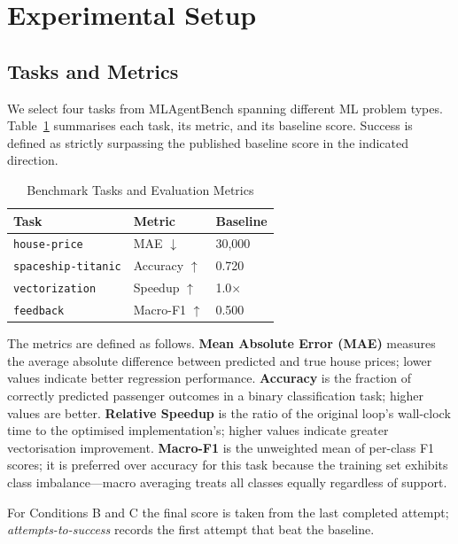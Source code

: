 \documentclass[conference]{IEEEtran}
\begin{document}
\section{Experimental Setup}

\subsection{Tasks and Metrics}

We select four tasks from MLAgentBench spanning different ML problem types.
Table~\ref{tab:tasks} summarises each task, its metric, and its baseline score.
Success is defined as strictly surpassing the published baseline score in the
indicated direction.

\begin{table}[h]
\caption{Benchmark Tasks and Evaluation Metrics}
\label{tab:tasks}
\centering
\begin{tabular}{lll}
\toprule
Task & Metric & Baseline \\
\midrule
\texttt{house-price} & MAE $\downarrow$ & 30{,}000 \\
\texttt{spaceship-titanic} & Accuracy $\uparrow$ & 0.720 \\
\texttt{vectorization} & Speedup $\uparrow$ & 1.0$\times$ \\
\texttt{feedback} & Macro-F1 $\uparrow$ & 0.500 \\
\bottomrule
\end{tabular}
\end{table}

The metrics are defined as follows. \textbf{Mean Absolute Error (MAE)}
measures the average absolute difference between predicted and true house
prices; lower values indicate better regression performance. \textbf{Accuracy}
is the fraction of correctly predicted passenger outcomes in a binary
classification task; higher values are better. \textbf{Relative Speedup}
is the ratio of the original loop's wall-clock time to the optimised
implementation's; higher values indicate greater vectorisation improvement.
\textbf{Macro-F1} is the unweighted mean of per-class F1 scores; it is
preferred over accuracy for this task because the training set exhibits class
imbalance---macro averaging treats all classes equally regardless of support.

For Conditions B and C the final score is taken from the last completed
attempt; \emph{attempts-to-success} records the first attempt that beat the
baseline.
\end{document}
